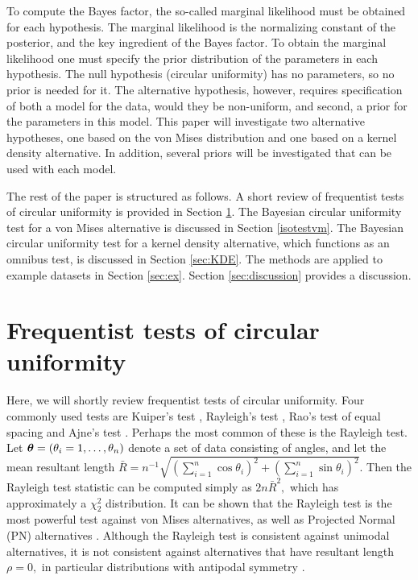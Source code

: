  To compute the Bayes factor, the so-called marginal likelihood must be obtained for each hypothesis. The marginal likelihood is the normalizing constant of the posterior, and the key ingredient of the Bayes factor. To obtain the marginal likelihood one must specify the prior distribution of the parameters in each hypothesis. The null hypothesis (circular uniformity) has no parameters, so no prior is needed for it. The alternative hypothesis, however, requires specification of both a model for the data, would they be non-uniform, and second, a prior for the parameters in this model. This paper will investigate two alternative hypotheses, one based on the von Mises distribution and one based on a kernel density alternative. In addition, several priors will be investigated that can be used with each model.  

The rest of the paper is structured as follows. A short review of frequentist tests of circular uniformity is provided in Section \ref{sec:freq}. The Bayesian circular uniformity test for a von Mises alternative is discussed in Section \ref{isotestvm}. The Bayesian circular uniformity test for a kernel density alternative, which functions as an omnibus test, is discussed in Section \ref{sec:KDE}. The methods are applied to example datasets in Section \ref{sec:ex}. Section \ref{sec:discussion} provides a discussion.

\section{Frequentist tests of circular uniformity} \label{sec:freq}

Here, we will shortly review frequentist tests of circular uniformity. Four commonly used tests are Kuiper's test \citep{kuiper1960tests}, Rayleigh's test \citep{mardia2009directional, brazier1994confidence}, Rao's test of equal spacing \citep{rao1976some} and Ajne's test \citep{ajne1968simple}. Perhaps the most common of these is the Rayleigh test. Let \( \boldsymbol{\theta} = (\theta_i = 1, \dots, \theta_n) \) denote a set of data consisting of angles, and let the mean resultant length \( \bar{R} = n^{-1} \sqrt{ (\sum_{i=1}^n \cos \theta_i)^2 + (\sum_{i=1}^n \sin \theta_i)^2} \). Then the Rayleigh test statistic can be computed simply as \( 2 n \bar{R}^2,\) which has approximately a \( \chi^2_2 \) distribution. It can be shown that the Rayleigh test is the most powerful test against von Mises alternatives, as well as Projected Normal (PN) alternatives \citep{bhattacharyya1969hodges}. Although the Rayleigh test is consistent against unimodal alternatives, it is not consistent against alternatives that have resultant length \( \rho = 0,\) in particular distributions with antipodal symmetry \citep{mardia2009directional}.

